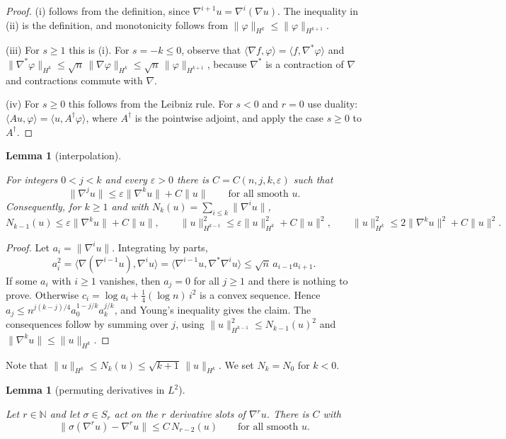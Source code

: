 \documentclass[11pt,reqno]{amsart}
\newtheorem{lemma}[theorem]{Lemma}
\theoremstyle{definition}
\theoremstyle{remark}
\newcommand{\N}{\mathbb{N}}
\newcommand{\ip}[2]{\langle #1,#2\rangle}
\newcommand{\norm}[1]{\lVert #1\rVert}
\newcommand{\lean}[1]{}
\newcommand{\uses}[1]{}
\numberwithin{equation}{section}
\begin{document}
\begin{proof}
(i) follows from the definition, since $\nabla^{i+1}u=\nabla^i(\nabla u)$. The inequality in (ii) is
the definition, and monotonicity follows from $\norm\varphi_{H^{k}}\le\norm\varphi_{H^{k+1}}$.

(iii) For $s\ge1$ this is (i). For $s=-k\le0$, observe that
$\ip{\nabla f}{\varphi}=\ip{f}{\nabla^*\varphi}$ and
$\norm{\nabla^*\varphi}_{H^k}\le\sqrt n\,\norm{\nabla\varphi}_{H^k}\le\sqrt n\,\norm{\varphi}_{H^{k+1}}$,
because $\nabla^*$ is a contraction of $\nabla$ and contractions commute with $\nabla$.

(iv) For $s\ge0$ this follows from the Leibniz rule. For $s<0$ and $r=0$ use duality:
$\ip{Au}{\varphi}=\ip{u}{A^\dagger\varphi}$, where $A^\dagger$ is the pointwise adjoint, and apply the
case $s\ge0$ to $A^\dagger$.
\end{proof}

\begin{lemma}[interpolation]\label{lem:interp}
\lean{ShortTime.jetNorm_le_interp, ShortTime.exists_jetSum_pred_le, ShortTime.exists_sobolevNormSq_pred_le, ShortTime.exists_sobolevNormSq_le}
\uses{def:sobolev}
For integers $0<j<k$ and every $\varepsilon>0$ there is $C=C(n,j,k,\varepsilon)$ such that
\[
  \norm{\nabla^ju}\le\varepsilon\norm{\nabla^ku}+C\norm u\qquad\text{for all smooth }u.
\]
Consequently, for $k\ge1$ and with $N_k(u)=\sum_{i\le k}\norm{\nabla^iu}$,
\[
  N_{k-1}(u)\le\varepsilon\norm{\nabla^ku}+C\norm u,\qquad
  \norm{u}_{H^{k-1}}^2\le\varepsilon\norm{u}_{H^k}^2+C\norm u^2,\qquad
  \norm{u}_{H^k}^2\le2\norm{\nabla^ku}^2+C\norm u^2.
\]
\end{lemma}

\begin{proof}
Let $a_i=\norm{\nabla^iu}$. Integrating by parts,
\[
  a_i^2=\ip{\nabla(\nabla^{i-1}u)}{\nabla^iu}=\ip{\nabla^{i-1}u}{\nabla^*\nabla^iu}\le\sqrt n\,a_{i-1}a_{i+1}.
\]
If some $a_i$ with $i\ge1$ vanishes, then $a_j=0$ for all $j\ge1$ and there is nothing to prove.
Otherwise $c_i=\log a_i+\tfrac14(\log n)\,i^2$ is a convex sequence. Hence
$a_j\le n^{j(k-j)/4}a_0^{1-j/k}a_k^{j/k}$, and Young's inequality gives the claim. The consequences
follow by summing over $j$, using $\norm u_{H^{k-1}}^2\le N_{k-1}(u)^2$ and
$\norm{\nabla^ku}\le\norm u_{H^k}$.
\end{proof}

Note that $\norm u_{H^k}\le N_k(u)\le\sqrt{k+1}\,\norm u_{H^k}$. We set $N_k=N_0$ for $k<0$.

\begin{lemma}[permuting derivatives in $L^2$]\label{lem:ricci-l2}
\lean{ShortTime.exists_perm_bound, ShortTime.exists_swap_defect, ShortTime.toModel_iteratedCovGrad_domDomCongr}
\uses{def:sobolev}
Let $r\in\N$ and let $\sigma\in S_r$ act on the $r$ derivative slots of $\nabla^ru$. There is $C$ with
\[
  \norm{\sigma(\nabla^ru)-\nabla^ru}\le C\,N_{r-2}(u)\qquad\text{for all smooth }u.
\]
\end{lemma}
\end{document}
